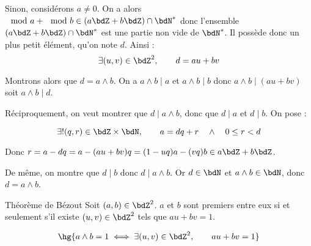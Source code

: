\documentclass[a4paper,french,bookmarks]{article}
\begin{document}
\begin{enumerate}
{\begin{enumerate}
            \ithand Sinon, considérons $a \neq 0$. On a alors $\mod{a} + \mod{b} \in \left(a\bdZ + b\bdZ\right) \cap \bdN^*$ donc l'ensemble $\left(a\bdZ + b\bdZ\right) \cap \bdN^*$ est une partie non vide de $\bdN^*$. Il possède donc un plus petit élément, qu'on note $d$. Ainsi :
            \[\exists (u, v) \in \bdZ^2,\qquad d = au + bv\]
            
            \begin{enumerate}
                \itstar Montrons alors que $d = a \land b$. On a $a \land b \mid a$ et $a \land b \mid b$ donc $a \land b \mid (au + bv)$ soit $a \land b \mid d$.
                
                \itstar Réciproquement, on veut montrer que $d \mid a \land b$, donc que $d \mid a $ et $d \mid b$. On pose :
            
                \[ \exists ! (q, r) \in \bdZ\times\bdN,\qquad a = dq + r \quad \land \quad 0 \leq r < d\]
            
                Donc $r = a - dq = a - (au +bv)q = (1-uq)a - (vq)b \in a\bdZ + b\bdZ$. 
                
                \itstar De même, on montre que $d \mid b$ donc $d \mid a \land b$. Or $d \in \bdN$ et $a \land b \in \bdN$, donc $d = a \land b$.
            
            \end{enumerate}
            
        \end{enumerate}
    }
    
    \begin{theorem*}{Théorème de Bézout}{}
        Soit $(a, b) \in \bdZ^2$. $a$ et $b$ sont premiers entre eux si et seulement s'il existe $(u, v) \in \bdZ^2$ tels que $au + bv = 1$.
        
        \[ \hg{a \land b = 1 \iff \exists (u, v) \in \bdZ^2,\qquad au + bv = 1}\]
    \end{theorem*}
    
\end{enumerate}
\end{document}
